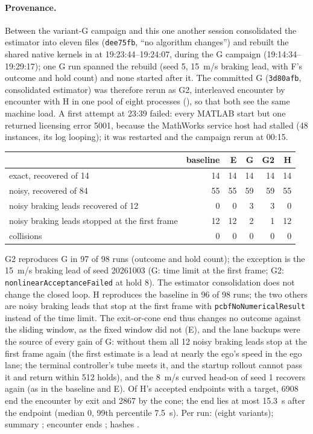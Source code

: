 \documentclass[11pt]{article}
\begin{document}
\paragraph{Provenance.} Between the variant-G campaign and this one another
session consolidated the estimator into eleven files (\texttt{dee75fb}, ``no
algorithm changes'') and rebuilt the shared native kernels in
 at 19:23:44--19:24:07, during the G campaign
(19:14:34--19:29:17); one G run spanned the rebuild (seed 5, 15~m/s braking
lead, with F's outcome and hold count) and none started after it. The
committed G (\texttt{3d80afb}, consolidated estimator) was therefore rerun as
G2, interleaved encounter by encounter with H in one pool of eight processes
(), so that both see the same machine load. A
first attempt at 23:39 failed: every MATLAB start but one returned licensing
error 5001, because the MathWorks service host had stalled (48 instances, its
log looping); it was restarted and the campaign rerun at 00:15.

\begin{center}
\begin{tabular}{lrrrrr}
\toprule
 & baseline & E & G & G2 & H\\
\midrule
exact, recovered of 14 & 14 & 14 & 14 & 14 & 14\\
noisy, recovered of 84 & 55 & 55 & 59 & 59 & 55\\
noisy braking leads recovered of 12 & 0 & 0 & 3 & 3 & 0\\
noisy braking leads stopped at the first frame & 12 & 12 & 2 & 1 & 12\\
collisions & 0 & 0 & 0 & 0 & 0\\
\bottomrule
\end{tabular}
\end{center}
G2 reproduces G in 97 of 98 runs (outcome and hold count); the exception is
the 15~m/s braking lead of seed 20261003 (G: time limit at the first frame;
G2: \texttt{nonlinearAcceptanceFailed} at hold 8). The estimator consolidation
does not change the closed loop. H reproduces the baseline in 96 of 98 runs;
the two others are noisy braking leads that stop at the first frame with
\texttt{pcbfNoNumericalResult} instead of the time limit. The exit-or-cone end
thus changes no outcome against the sliding window, as the fixed window did
not (E), and the lane backups were the source of every gain of G: without
them all 12 noisy braking leads stop at the first frame again (the first
estimate is a lead at nearly the ego's speed in the ego lane; the terminal
controller's tube meets it, and the startup rollout cannot pass it and return
within 512 holds), and the 8~m/s curved head-on of seed 1 recovers again (as
in the baseline and E). Of H's accepted endpoints with a target, 6908 end the
encounter by exit and 2867 by the cone; the end lies at most 15.3~s after the
endpoint (median 0, 99th percentile 7.5~s). Per run:
 (eight variants); summary ;
encounter ends ; hashes
.
\end{document}
